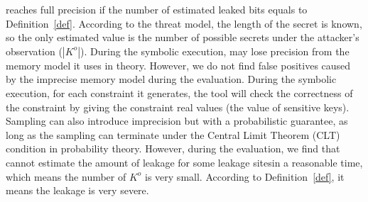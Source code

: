\tool{} reaches full precision if the number of estimated leaked bits 
equals to Definition~\ref{def}. According to the threat model, the 
length of the secret is known, so the only estimated value is the number
of possible secrets under the attacker's observation ($|K^o|$). 
During the symbolic execution, \tool{} may lose precision from the 
memory model it uses in theory. However, we do not find false positives 
caused by the imprecise memory model during the evaluation. 
During the symbolic execution, for each constraint it generates,
the tool will check the correctness of the constraint by giving 
the constraint real values (the value of sensitive keys). Sampling 
can also introduce imprecision but with a probabilistic guarantee, 
as long as the sampling can terminate under the Central Limit Theorem (CLT) condition in probability theory. 
However, during the evaluation, we find that \tool{} cannot estimate 
the amount of leakage for some leakage sitesin a reasonable time, 
which means the number of $K^o$ is very small. According to Definition~\ref{def}, 
it means the leakage is very severe.

